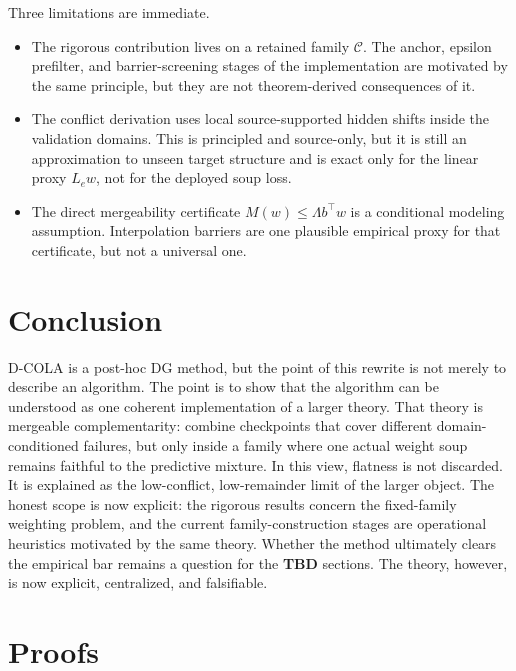 \documentclass{article}
\theoremstyle{definition}
\newcommand{\cC}{\mathcal{C}}
\newcommand{\TBD}{\textbf{TBD}}
\newcommand{\dcola}{\textup{\textsc{D-COLA}}}
\begin{document}
Three limitations are immediate.
\begin{itemize}[leftmargin=1.3em]
    \item The rigorous contribution lives on a retained family \(\cC\). The anchor, epsilon prefilter, and barrier-screening stages of the implementation are motivated by the same principle, but they are not theorem-derived consequences of it.
    \item The conflict derivation uses local source-supported hidden shifts inside the validation domains. This is principled and source-only, but it is still an approximation to unseen target structure and is exact only for the linear proxy \(L_e w\), not for the deployed soup loss.
    \item The direct mergeability certificate \(M(w)\le \Lambda b^\top w\) is a conditional modeling assumption. Interpolation barriers are one plausible empirical proxy for that certificate, but not a universal one.
\end{itemize}

\section{Conclusion}

\dcola{} is a post-hoc DG method, but the point of this rewrite is not merely to describe an algorithm. The point is to show that the algorithm can be understood as one coherent implementation of a larger theory. That theory is mergeable complementarity: combine checkpoints that cover different domain-conditioned failures, but only inside a family where one actual weight soup remains faithful to the predictive mixture. In this view, flatness is not discarded. It is explained as the low-conflict, low-remainder limit of the larger object. The honest scope is now explicit: the rigorous results concern the fixed-family weighting problem, and the current family-construction stages are operational heuristics motivated by the same theory. Whether the method ultimately clears the empirical bar remains a question for the \TBD{} sections. The theory, however, is now explicit, centralized, and falsifiable.




\appendix

\section{Proofs}
\end{document}
